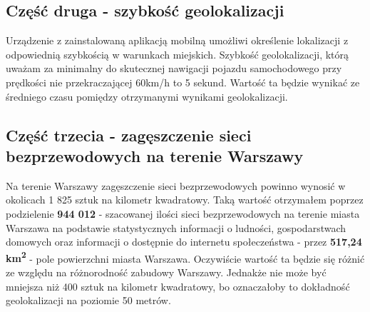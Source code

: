 \subsection{Część druga - szybkość geolokalizacji}
Urządzenie z zainstalowaną aplikacją mobilną umożliwi określenie lokalizacji z odpowiednią szybkością w warunkach miejskich. Szybkość geolokalizacji, którą uważam za minimalny do skutecznej nawigacji pojazdu samochodowego przy prędkości nie przekraczającej 60km/h to 5 sekund. Wartość ta będzie wynikać ze średniego czasu pomiędzy otrzymanymi wynikami geolokalizacji.

\subsection{Część trzecia - zagęszczenie sieci bezprzewodowych na terenie Warszawy}
Na terenie Warszawy zagęszczenie sieci bezprzewodowych powinno wynosić w okolicach 1 825 sztuk na kilometr kwadratowy. Taką wartość otrzymałem poprzez podzielenie \textbf{944 012} - szacowanej ilości sieci bezprzewodowych na terenie miasta Warszawa na podstawie statystycznych informacji o ludności, gospodarstwach domowych oraz informacji o dostępnie do internetu społeczeństwa - przez \textbf{517,24 km\textsuperscript{2}} - pole powierzchni miasta Warszawa. Oczywiście wartość ta będzie się różnić ze względu na różnorodność zabudowy Warszawy. Jednakże nie może być mniejsza niż 400 sztuk na kilometr kwadratowy, bo oznaczałoby to dokładność geolokalizacji na poziomie 50 metrów.
